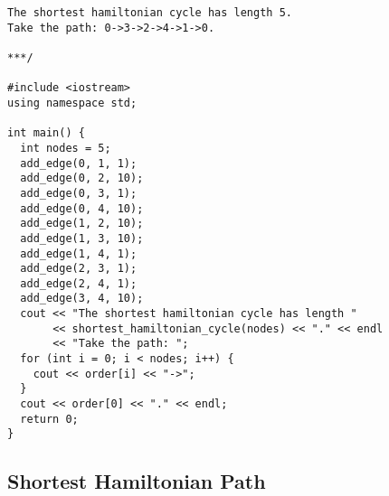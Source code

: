 \begin{lstlisting}
The shortest hamiltonian cycle has length 5.
Take the path: 0->3->2->4->1->0.

***/

#include <iostream>
using namespace std;

int main() {
  int nodes = 5;
  add_edge(0, 1, 1);
  add_edge(0, 2, 10);
  add_edge(0, 3, 1);
  add_edge(0, 4, 10);
  add_edge(1, 2, 10);
  add_edge(1, 3, 10);
  add_edge(1, 4, 1);
  add_edge(2, 3, 1);
  add_edge(2, 4, 1);
  add_edge(3, 4, 10);
  cout << "The shortest hamiltonian cycle has length "
       << shortest_hamiltonian_cycle(nodes) << "." << endl
       << "Take the path: ";
  for (int i = 0; i < nodes; i++) {
    cout << order[i] << "->";
  }
  cout << order[0] << "." << endl;
  return 0;
}
\end{lstlisting}
\subsection{Shortest Hamiltonian Path}
